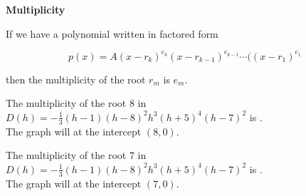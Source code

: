 \documentclass{ximera}
\author{Lee Wayand}
\begin{document}
\begin{exercise}






\begin{idea} \textbf{\textcolor{blue!55!black}{Multiplicity}}


If we have a polynomial written in factored form

\[
p(x) = A (x-r_k)^{e_k} (x-r_{k-1})^{e_{k-1}}  \cdots ((x-r_1)^{e_1}
\]

then the multiplicity of the root $r_m$ is $e_m$. \\





\end{idea}






\begin{question}



The multiplicity of the root $8$ in $D(h) = -\frac{1}{3} (h - 1) (h - 8)^2 h^3 (h + 5)^4 (h - 7)^2$ is . \\



The graph will  at the intercept $(8, 0)$.




\end{question}











\begin{question}



The multiplicity of the root $7$ in $D(h) = -\frac{1}{3} (h - 1) (h - 8)^2 h^3 (h + 5)^4 (h - 7)^2$ is . \\



The graph will  at the intercept $(7, 0)$.




\end{question}













\end{exercise}
\end{document}
